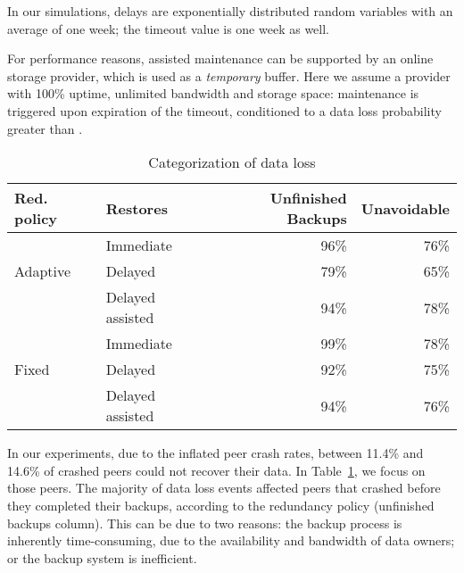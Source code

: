 \documentclass[conference,10pt]{IEEEtran}
\begin{document}
In our simulations, delays are exponentially distributed random variables with an average of one week; the timeout value is one week as well.

For performance reasons, assisted maintenance can be supported by an online storage provider, which is used as a \emph{temporary} buffer. Here we assume a provider with 100\% uptime, unlimited bandwidth and storage space: maintenance is triggered upon expiration of the timeout, conditioned to a data loss probability greater than .


\begin{table}
\centering

\caption{Categorization of data loss}
\label{tab:dataloss}
\begin{tabular}{|l|l|r|r|}
\hline
Red. policy & Restores & Unfinished Backups & Unavoidable \\
\hline
\hline

& Immediate & 96\% & 76\% \\

\cline{2-4}

Adaptive & Delayed & 79\% & 65\% \\

\cline{2-4}

& Delayed assisted & 94\% & 78\% \\

\hline

& Immediate & 99\% & 78\% \\

\cline{2-4}

Fixed & Delayed & 92\% & 75\% \\

\cline{2-4}

& Delayed assisted & 94\% & 76\% \\

\hline
\end{tabular}
\end{table}

In our experiments, due to the inflated peer crash rates, between
11.4\% and 14.6\% of crashed peers could not recover their data. In
Table~\ref{tab:dataloss}, we focus on those peers. The majority of
data loss events affected peers that crashed before they completed
their backups, according to the redundancy policy (unfinished backups
column). This can be due to two reasons: the backup process is
inherently time-consuming, due to the availability and bandwidth of
data owners; or the backup system is inefficient.
\end{document}
